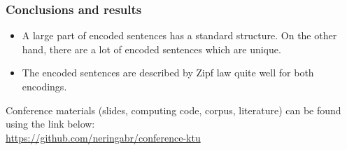 \documentclass{beamer}
\begin{document}

\begin{frame}
\frametitle{Conclusions and results}
\begin{itemize}
\item A large part of encoded sentences has a standard structure. On the 
other hand, there are a lot of encoded sentences which are unique.
\item The encoded sentences are described by Zipf law quite well for both 
encodings.
\end{itemize}
\end{frame}

\begin{frame}
\begin{center}
Conference materials (slides, computing code, corpus, literature) can be found
using the link below: \\
\href{https://github.com/neringabr/conference-ktu}{https://github.com/neringabr/conference-ktu}
\end{center}
\end{frame}
\end{document}
